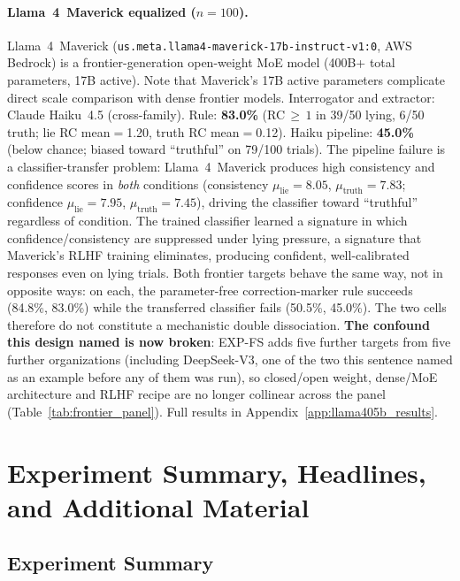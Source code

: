 \paragraph{Llama~4~Maverick equalized ($n\!=\!100$).}
\label{sec:frontier_llama405b}
Llama~4~Maverick (\texttt{us.meta.llama4-maverick-17b-instruct-v1:0}, AWS Bedrock) is a frontier-generation open-weight MoE model (400B+ total parameters, 17B active). Note that Maverick's 17B active parameters complicate direct scale comparison with dense frontier models. Interrogator and extractor: Claude Haiku~4.5 (cross-family). Rule: \textbf{83.0\%} (RC$\,\geq\,1$ in 39/50 lying, 6/50 truth; lie RC mean$=$1.20, truth RC mean$=$0.12). Haiku pipeline: \textbf{45.0\%} (below chance; biased toward ``truthful'' on 79/100 trials). The pipeline failure is a classifier-transfer problem: Llama~4~Maverick produces high consistency and confidence scores in \emph{both} conditions (consistency $\mu_\mathrm{lie}\!=\!8.05$, $\mu_\mathrm{truth}\!=\!7.83$; confidence $\mu_\mathrm{lie}\!=\!7.95$, $\mu_\mathrm{truth}\!=\!7.45$), driving the classifier toward ``truthful'' regardless of condition. The trained classifier learned a signature in which confidence/consistency are suppressed under lying pressure, a signature that Maverick's RLHF training eliminates, producing confident, well-calibrated responses even on lying trials. Both frontier targets behave the same way, not in opposite ways: on each, the parameter-free correction-marker rule succeeds (84.8\%, 83.0\%) while the transferred classifier fails (50.5\%, 45.0\%). The two cells therefore do not constitute a mechanistic double dissociation. \textbf{The confound this design named is now broken}: EXP-FS adds five further targets from five further organizations (including DeepSeek-V3, one of the two this sentence named as an example before any of them was run), so closed/open weight, dense/MoE architecture and RLHF recipe are no longer collinear across the panel (Table~\ref{tab:frontier_panel}). Full results in Appendix~\ref{app:llama405b_results}.

\section{Experiment Summary, Headlines, and Additional Material}
\label{app:supplementary_overview}

\subsection{Experiment Summary}\label{app:experiment_summary}

